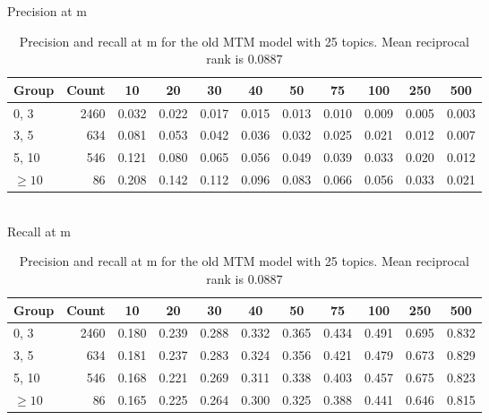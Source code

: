 \begin{table}{\small
Precision at m\\
\begin{tabular}{| l | r || c | c | c | c | c | c | c | c | c |}\hline
 Group    & Count &    10 &    20 &    30 &    40 &    50 &    75 &   100 &   250 &   500  \\
\hline
  0,    3 &      2460 & 0.032 & 0.022 & 0.017 & 0.015 & 0.013 & 0.010 & 0.009 & 0.005 & 0.003  \\
  3,    5 &       634 & 0.081 & 0.053 & 0.042 & 0.036 & 0.032 & 0.025 & 0.021 & 0.012 & 0.007  \\
  5,   10 &       546 & 0.121 & 0.080 & 0.065 & 0.056 & 0.049 & 0.039 & 0.033 & 0.020 & 0.012  \\
 $\geq 10$ &        86 & 0.208 & 0.142 & 0.112 & 0.096 & 0.083 & 0.066 & 0.056 & 0.033 & 0.021  \\
\hline\end{tabular}\\

Recall at m\\
\begin{tabular}{| l | r || c | c | c | c | c | c | c | c | c |}\hline
 Group    & Count &    10 &    20 &    30 &    40 &    50 &    75 &   100 &   250 &   500  \\ \hline
  0,    3 &      2460 & 0.180 & 0.239 & 0.288 & 0.332 & 0.365 & 0.434 & 0.491 & 0.695 & 0.832  \\
  3,    5 &       634 & 0.181 & 0.237 & 0.283 & 0.324 & 0.356 & 0.421 & 0.479 & 0.673 & 0.829  \\
  5,   10 &       546 & 0.168 & 0.221 & 0.269 & 0.311 & 0.338 & 0.403 & 0.457 & 0.675 & 0.823  \\
 $\geq 10$ &        86 & 0.165 & 0.225 & 0.264 & 0.300 & 0.325 & 0.388 & 0.441 & 0.646 & 0.815  \\
\hline\end{tabular}
\caption{Precision and recall at m for the old MTM model with 25 topics. Mean reciprocal rank is 0.0887}\label{tbl:mtm-old}
}\end{table}

